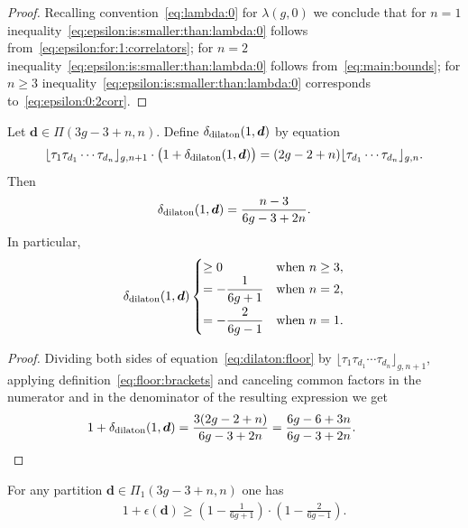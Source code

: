 \begin{proof}Recalling convention~\eqref{eq:lambda:0} for $\lambda(g,0)$ we conclude that
for $n=1$ inequality~\eqref{eq:epsilon:is:smaller:than:lambda:0}
follows from~\eqref{eq:epsilon:for:1:correlators};
for $n=2$ inequality~\eqref{eq:epsilon:is:smaller:than:lambda:0}
follows from~\eqref{eq:main:bounds};
for $n\ge 3$ inequality~\eqref{eq:epsilon:is:smaller:than:lambda:0}
corresponds to~\eqref{eq:epsilon:0:2corr}.
\end{proof}

\begin{Lemma}\label{lm:dilaton}
Let $\boldsymbol{d}\in\Pi(3g-3+n,n)$.
Define $\delta_{\rm dilaton}(1,\boldsymbol{d})$
by equation
\begin{gather}\label{eq:dilaton:floor}
\lfloor \tau_1\tau_{d_1} \cdots \tau_{d_n}\rfloor_{g,n+1}
\cdot\big(1+\delta_{\rm dilaton}(1,\boldsymbol{d})\big)
=(2g-2+n)
\lfloor \tau_{d_1} \cdots \tau_{d_n}\rfloor_{g,n} .
\end{gather}
Then
\[
\delta_{\rm dilaton}(1,\boldsymbol{d})
=\frac{n-3}{6g-3+2n} .
\]
In particular,
\begin{gather}\label{eq:delta:dilaton}
\delta_{\rm dilaton}(1,\boldsymbol{d})
\begin{cases}
\ge 0&\text{when }n\ge 3 ,
\\
= -\dfrac{1}{6g+1}
&\text{when }n=2 ,
\vspace{1mm}\\
= -\dfrac{2}{6g-1}
&\text{when }n=1 .
\end{cases}
\end{gather}
\end{Lemma}

\begin{proof}Dividing both sides of equation~\eqref{eq:dilaton:floor} by
$\lfloor \tau_1\tau_{d_1} \cdots \tau_{d_n}\rfloor_{g,n+1}$,
applying definition~\eqref{eq:floor:brackets}
and canceling common factors in the numerator and in the denominator
of the resulting expression we get
\[
1+\delta_{\rm dilaton}(1,\boldsymbol{d})
=\frac{3(2g-2+n)}{6g-3+2n}
=\frac{6g-6+3n}{6g-3+2n} .\tag*{\qed}
\]\renewcommand{\qed}{}
\end{proof}

\begin{Corollary}\label{cor:epsilon:L:1}
For any partition
$\boldsymbol{d}\in\Pi_1(3g-3+n,n)$ one has
\begin{gather}\label{eq:epsilon:L:1}
1+\epsilon(\boldsymbol{d})\ge
\left(1-\frac{1}{6g+1}\right)
\cdot\left(1-\frac{2}{6g-1}\right) .
\end{gather}
\end{Corollary}


